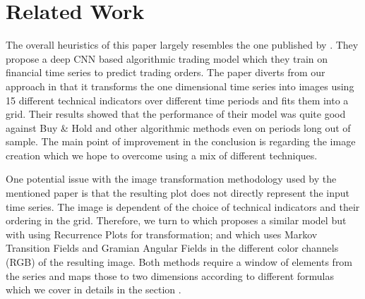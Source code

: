 \documentclass[11pt, a4paper]{article}
\begin{document}
\section{Related Work}
\label{sec:RelWork}

The overall heuristics of this paper largely resembles the one published by \cite{sezer2018algorithmic}. They propose a deep CNN based algorithmic trading model which they train on financial time series to predict trading orders. The paper diverts from our approach in that it transforms the one dimensional time series into images using 15 different technical indicators over different time periods and fits them into a grid. Their results showed that the performance of their model was quite good against Buy \& Hold and other algorithmic methods even on periods long out of sample. The main point of improvement in the conclusion is regarding the image creation which we hope to overcome using a mix of different techniques. 

One potential issue with the image transformation methodology used by the mentioned paper is that the resulting plot does not directly represent the input time series. The image is dependent of the choice of technical indicators and their ordering in the grid. Therefore, we turn to \cite{hatami2018classification} which proposes a similar model but with using Recurrence Plots for transformation; and \cite{wang2015encoding} which uses Markov Transition Fields and Gramian Angular Fields in the different color channels (RGB) of the resulting image. Both methods require a window of elements from the series and maps those to two dimensions according to different formulas which we cover in details in the section .




\end{document}
